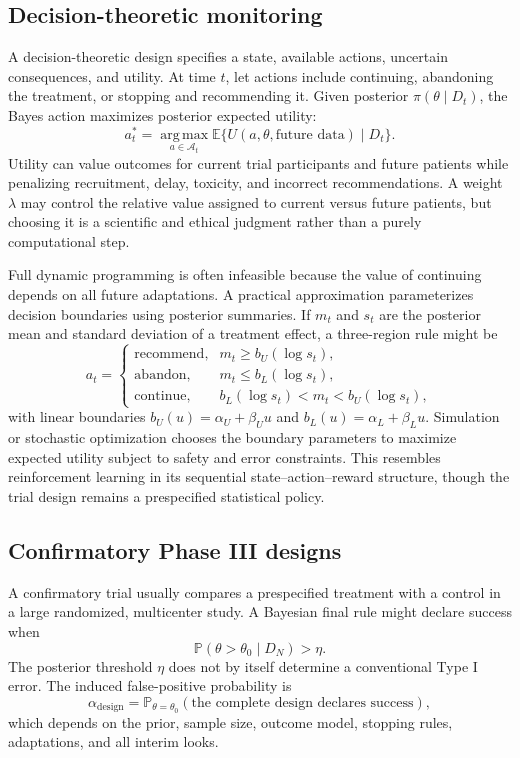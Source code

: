 \documentclass[12pt,oneside]{book}
\numberwithin{equation}{section}
\theoremstyle{definition}
\theoremstyle{plain}
\theoremstyle{remark}
\newcommand{\E}{\mathbb{E}}
\newcommand{\Prob}{\mathbb{P}}
\newcommand{\argmax}{\operatorname*{arg\,max}}
\begin{document}
\subsection{Decision-theoretic monitoring}

A decision-theoretic design specifies a state, available actions, uncertain
consequences, and utility.  At time $t$, let actions include continuing,
abandoning the treatment, or stopping and recommending it.  Given posterior
$\pi(\theta\mid D_t)$, the Bayes action maximizes posterior expected utility:
\begin{equation}
  a_t^*
  =\argmax_{a\in\mathcal A_t}
     \E\{U(a,\theta,\text{future data})\mid D_t\}.
  \label{eq:posterior-expected-utility}
\end{equation}
Utility can value outcomes for current trial participants and future patients
while penalizing recruitment, delay, toxicity, and incorrect recommendations.
A weight $\lambda$ may control the relative value assigned to current versus
future patients, but choosing it is a scientific and ethical judgment rather
than a purely computational step.

Full dynamic programming is often infeasible because the value of continuing
depends on all future adaptations.  A practical approximation parameterizes
decision boundaries using posterior summaries.  If $m_t$ and $s_t$ are the
posterior mean and standard deviation of a treatment effect, a three-region
rule might be
\[
 a_t=
 \begin{cases}
   \text{recommend}, & m_t\ge b_U(\log s_t),\\
   \text{abandon}, & m_t\le b_L(\log s_t),\\
   \text{continue}, & b_L(\log s_t)<m_t<b_U(\log s_t),
 \end{cases}
\]
with linear boundaries $b_U(u)=\alpha_U+\beta_Uu$ and
$b_L(u)=\alpha_L+\beta_Lu$.  Simulation or stochastic optimization chooses the
boundary parameters to maximize expected utility subject to safety and error
constraints.  This resembles reinforcement learning in its sequential
state--action--reward structure, though the trial design remains a
prespecified statistical policy.

\subsection{Confirmatory Phase III designs}

A confirmatory trial usually compares a prespecified treatment with a control
in a large randomized, multicenter study.  A Bayesian final rule might declare
success when
\[
  \Prob(\theta>\theta_0\mid D_N)>\eta.
\]
The posterior threshold $\eta$ does not by itself determine a conventional
Type I error.  The induced false-positive probability is
\[
  \alpha_{\mathrm{design}}
  =\Prob_{\theta=\theta_0}\!\left(
       \text{the complete design declares success}
    \right),
\]
which depends on the prior, sample size, outcome model, stopping rules,
adaptations, and all interim looks.
\end{document}
